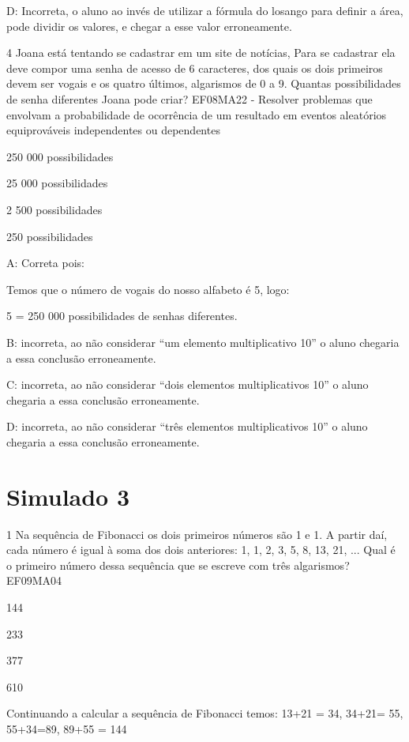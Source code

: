 D: Incorreta, o aluno ao invés de utilizar a fórmula do losango para
definir a área, pode dividir os valores, e chegar a esse valor
erroneamente.

\num{4} Joana está tentando se cadastrar em um site de notícias, Para se
cadastrar ela deve compor uma senha de acesso de 6 caracteres, dos quais
os dois primeiros devem ser vogais e os quatro últimos, algarismos de 0
a 9. Quantas possibilidades de senha diferentes Joana pode criar?
EF08MA22 - Resolver problemas que envolvam a probabilidade de ocorrência
de um resultado em eventos aleatórios equiprováveis independentes ou
dependentes

\item 250 000 possibilidades
\item 25 000 possibilidades
\item 2 500 possibilidades
\item 250 possibilidades

A: Correta pois:

Temos que o número de vogais do nosso alfabeto é 5, logo:

5 = 250 000 possibilidades de senhas diferentes.

B: incorreta, ao não considerar ``um elemento multiplicativo 10'' o
aluno chegaria a essa conclusão erroneamente.

C: incorreta, ao não considerar ``dois elementos multiplicativos 10'' o
aluno chegaria a essa conclusão erroneamente.

D: incorreta, ao não considerar ``três elementos multiplicativos 10'' o
aluno chegaria a essa conclusão erroneamente.

\section{Simulado 3}

\num{1} Na sequência de Fibonacci os dois primeiros números são 1 e 1. A
partir daí, cada número é igual à soma dos dois anteriores: 1, 1, 2, 3,
5, 8, 13, 21, ... Qual é o primeiro número dessa sequência que se
escreve com três algarismos? EF09MA04

\item 144
\item 233
\item 377
\item 610

Continuando a calcular a sequência de Fibonacci temos: 13+21 = 34,
34+21= 55, 55+34=89, 89+55 = 144


